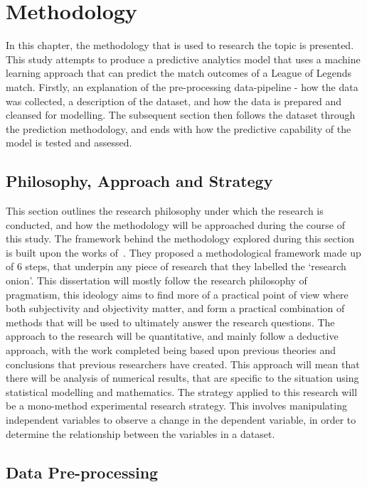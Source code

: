 \chapter{Methodology}\label{ch:methodology}

In this chapter, the methodology that is used to research the topic is presented.
This study attempts to produce a predictive analytics model that uses a machine learning approach that can predict the match outcomes of a League of Legends match.
Firstly, an explanation of the pre-processing data-pipeline - how the data was collected, a description of the dataset, and how the data is prepared and cleansed for modelling.
The subsequent section then follows the dataset through the prediction methodology, and ends with how the predictive capability of the model is tested and assessed.

\section{Philosophy, Approach and Strategy}\label{sec:Research Philosophy}

This section outlines the research philosophy under which the research is conducted, and how the methodology will be approached during the course of this study.
The framework behind the methodology explored during this section is built upon the works of~\citet{saunders2007research}.
They proposed a methodological framework made up of 6 steps, that underpin any piece of research that they labelled the `research onion'.
This dissertation will mostly follow the research philosophy of pragmatism, this ideology aims to find more of a practical point of view where both subjectivity and objectivity matter, and form a practical combination of methods that will be used to ultimately answer the research questions.
The approach to the research will be quantitative, and mainly follow a deductive approach, with the work completed being based upon previous theories and conclusions that previous researchers have created.
This approach will mean that there will be analysis of numerical results, that are specific to the situation using statistical modelling and mathematics.
The strategy applied to this research will be a mono-method experimental research strategy.
This involves manipulating independent variables to observe a change in the dependent variable, in order to determine the relationship between the variables in a dataset.

\section{Data Pre-processing}\label{sec:Data Pre-processing}
